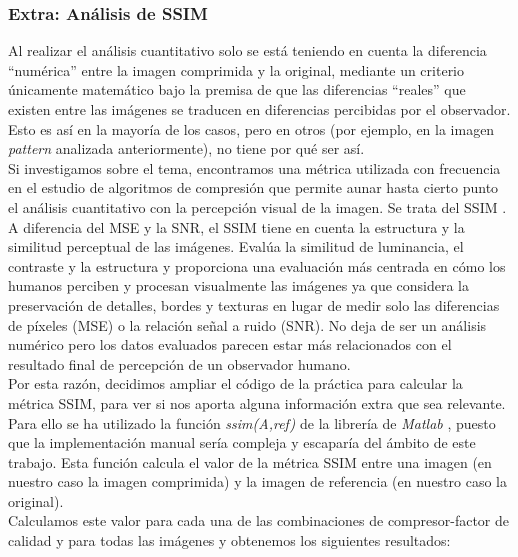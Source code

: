 \documentclass[12pt,a4paper]{article}
\begin{document}
\subsubsection{Extra: Análisis de SSIM}
Al realizar el análisis cuantitativo solo se está teniendo en cuenta la diferencia ``numérica'' entre la imagen comprimida y la original, mediante un criterio únicamente matemático bajo la premisa de que las diferencias ``reales'' que existen entre las imágenes se traducen en diferencias percibidas por el observador. Esto es así en la mayoría de los casos, pero en otros (por ejemplo, en la imagen \textit{pattern} analizada anteriormente), no tiene por qué ser así.\\

Si investigamos sobre el tema, encontramos una métrica utilizada con frecuencia en el estudio de algoritmos de compresión que permite aunar hasta cierto punto el análisis cuantitativo con la percepción visual de la imagen. Se trata del SSIM \cite{Imatest-SSIM}.\\

A diferencia del MSE y la SNR, el SSIM tiene en cuenta la estructura y la similitud perceptual de las imágenes. Evalúa la similitud de luminancia, el contraste y la estructura y proporciona una evaluación más centrada en cómo los humanos perciben y procesan visualmente las imágenes ya que considera la preservación de detalles, bordes y texturas en lugar de medir solo las diferencias de píxeles (MSE) o la relación señal a ruido (SNR). No deja de ser un análisis numérico pero los datos evaluados parecen estar más relacionados con el resultado final de percepción de un observador humano.\\

Por esta razón, decidimos ampliar el código de la práctica para calcular la métrica SSIM, para ver si nos aporta alguna información extra que sea relevante.\\

Para ello se ha utilizado la función \textit{ssim(A,ref)} de la librería de \textit{Matlab}  \cite{mathworks-ssim}, puesto que la implementación manual sería compleja y escaparía del ámbito de este trabajo. Esta función calcula el valor de la métrica SSIM entre una imagen (en nuestro caso la imagen comprimida) y la imagen de referencia (en nuestro caso la original).\\

Calculamos este valor para cada una de las combinaciones de compresor-factor de calidad y para todas las imágenes y obtenemos los siguientes resultados:\\
\end{document}
